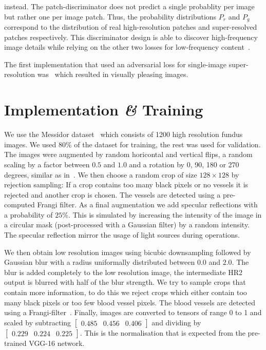 \documentclass{scrartcl}
\begin{document}
instead.
The patch-discriminator does not predict a single probablity per image but rather one per image patch.
Thus, the probability distributions $P_r$ and $P_g$ correspond to the distribution of real high-resolution patches and super-resolved patches respectively.
This discriminator design is able to discover high-frequency image details while relying on the other two losses for low-frequency content~\cite{PatchGAN}.

The first implementation that used an adversarial loss for single-image super-resolution was~\cite{SRGAN} which resulted in visually pleasing images.

\section{Implementation \textit{\&} Training}
We use the Messidor dataset~\cite{Messidor} which consists of 1200 high resolution fundus images.
We used 80\% of the dataset for training, the rest was used for validation.
The images were augmented by random horicontal and vertical flips, a random scaling by a factor between $0.5$ and $1.0$ and a rotation by 0, 90, 180 or 270 degrees, similar as in~\cite{LapSRN}.
We then choose a random crop of size $128 \times 128$ by rejection sampling:
If a crop contains too many black pixels or no vessels it is rejected and another crop is chosen.
The vessels are detected using a pre-computed Frangi filter.
As a final augmentation we add specular reflections with a probability of $25\%$.
This is simulated by increasing the intensity of the image in a circular mask (post-processed with a Gaussian filter) by a random intensity.
The specular reflection mirror the usage of light sources during operations.

We then obtain low resolution images using bicubic downsampling followed by Gaussian blur with a radius uniformally distributed between $0.0$ and $2.0$.
The blur is added completely to the low resolution image, the intermediate HR2 output is blurred with half of the blur strength.
We try to sample crops that contain more information, to do this we reject crops which either contain too many black pixels or too few blood vessel pixels.
The blood vessels are detected using a Frangi-filter~\cite{Frangi}.
Finally, images are converted to tensors of range 0 to 1 and scaled by subtracting
\(
\begin{bmatrix}
 0.485 & 0.456 & 0.406 
\end{bmatrix}
\)
and dividing by
\(
\begin{bmatrix}
0.229 & 0.224& 0.225
\end{bmatrix}
\).
This is the normalisation that is expected from the pre-trained VGG-16 network.
\end{document}
